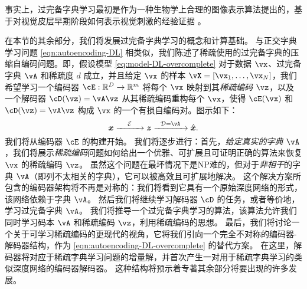 \documentclass[../../book-main.tex]{subfiles}
\begin{document}
事实上，过完备字典学习最初是作为一种生物学上合理的图像表示算法提出的，基于对视觉皮层早期阶段如何表示视觉刺激的经验证据 \cite{Olshausen1996-ap,Olshausen1997-yv}。

在本节的其余部分，我们将发展过完备字典学习的概念和计算基础。
与正交字典学习问题 \eqref{eqn:autoencoding-DL} 相类似，我们陈述了稀疏使用的过完备字典的压缩自编码问题。即，假设模型 \eqref{eq:model-DL-overcomplete} 对于数据 \(\vx\)、过完备字典 \(\vA\) 和稀疏度 \(d\) 成立，并且给定 \(\vx\) 的样本 \(\vX = [\vx_1, \dots, \vx_N]\)，我们希望学习一个编码器 \(\cE : \R^D \to \R^m\) 将每个 \(\vx\) 映射到其\textit{稀疏编码} \(\vz\)，以及一个解码器 \(\cD(\vz) = \vA \vz\) 从其稀疏编码重构每个 \(\vx\)，使得 \(\cE(\vx)\) 和 \(\cD(\vz) = \vA\vz\) 构成 \(\vx\) 的一个有损自编码对。图示如下：
\begin{equation}
\x \xrightarrow{\hspace{4mm} \mathcal{E} \hspace{4mm}}  \z \xrightarrow{\hspace{2mm} \mathcal{D} = \vA \hspace{2mm}}   \hat{\x}.  
\label{eqn:autoencoding-DL-overcomplete}
\end{equation}    
我们将从编码器 $\cE$ 的构建开始。
我们将逐步进行：首先，\textit{给定真实的字典 $\vA$}，我们将展示\textit{稀疏编码}问题如何给出一个优雅、可扩展且可证明正确的算法来恢复 $\vx$ 的稀疏编码 $\vz$。
虽然这个问题在最坏情况下是NP难的，但对于\textit{非相干}的字典 $\vA$（即列不太相关的字典），它可以被高效且可扩展地解决。
这个解决方案所包含的编码器架构将不再是对称的：我们将看到它具有一个原始深度网络的形式，该网络依赖于字典 $\vA$。
然后我们将继续学习解码器 $\cD$ 的任务，或者等价地，学习过完备字典 $\vA$。
我们将推导一个过完备字典学习的算法，该算法允许我们
同时学习码本 $\vA$ 和稀疏编码 $\vz$，利用稀疏编码的思想。
最后，我们将讨论一个关于可学习稀疏编码的更现代的视角，它将我们引向一个完全不对称的编码器-解码器结构，作为 \eqref{eqn:autoencoding-DL-overcomplete} 的替代方案。
在这里，解码器将对应于稀疏字典学习问题的增量解，并首次产生一对用于稀疏字典学习的类似深度网络的编码器解码器。
这种结构将预示着专著其余部分将要出现的许多发展。
\end{document}
